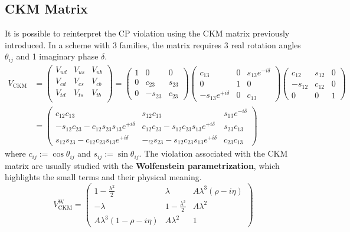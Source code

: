 \documentclass[10.75pt,a4paper,openright,bottom=2cm]{article}
\begin{document}
\subsection{CKM Matrix}
It is possible to reinterpret the CP violation using the CKM matrix previously introduced. In a scheme with 3 families, the matrix requires 3 real rotation angles $\theta_{ij}$ and 1 imaginary phase $\delta$.
\begin{align*}
V_{\text{CKM}}&=\begin{pmatrix}
    V_{ud} & V_{us} & V_{ub}\\
    V_{cd} & V_{cs} & V_{cb}\\
    V_{td} & V_{ts} & V_{tb}\\
\end{pmatrix}=\begin{pmatrix}
    1 & 0 & 0\\
    0 & c_{23} & s_{23}\\
    0 & -s_{23} & c_{23}
\end{pmatrix}
\begin{pmatrix}
    c_{13} & 0 & s_{13}e^{-i\delta}\\
    0 & 1 & 0\\
    -s_{13}e^{+i\delta} & 0 & c_{13}
\end{pmatrix}
\begin{pmatrix}
    c_{12} & s_{12} & 0\\
    -s_{12} & c_{12} & 0\\
    0 & 0 & 1
\end{pmatrix}\\
&=\begin{pmatrix}
    c_{12}c_{13} & s_{12}c_{13} & s_{13}e^{-i\delta}\\
    -s_{12}c_{23}-c_{12}s_{23}s_{13}e^{+i\delta} & c_{12}c_{23}-s_{12}c_{23}s_{13}e^{+i\delta} & s_{23}c_{13}\\
    s_{12}s_{23}-c_{12}c_{23}s_{13}e^{+i\delta} & -_{!2}s_{23}-s_{12}c_{23}s_{13}e^{+i\delta} & c_{23}c_{13}
\end{pmatrix}
\end{align*}
where $c_{ij}:=\cos\theta_{ij}$ and $s_{ij}:=\sin\theta_{ij}$. The violation associated with the CKM matrix are usually studied with the \textbf{Wolfenstein parametrization}, which highlights the small terms and their physical meaning.
\[
V_{\text{CKM}}^{\text{W}}=\begin{pmatrix}
    1-\frac{\lambda^2}{2} & \lambda & A\lambda^3(\rho-i\eta)\\
    -\lambda & 1-\frac{\lambda^2}{2} & A\lambda^2\\
    A\lambda^3(1-\rho-i\eta) & A\lambda^2 & 1
\end{pmatrix}
\]
\end{document}
